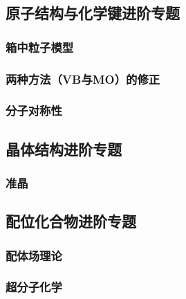 \newpage
\subsection{原子结构与化学键进阶专题}
\subsubsection{箱中粒子模型}
\subsubsection{两种方法（VB与MO）的修正}
\subsubsection{分子对称性}

\newpage
\subsection{晶体结构进阶专题}
\subsubsection{准晶}

\newpage
\subsection{配位化合物进阶专题}
\subsubsection{配体场理论}
\subsubsection{超分子化学}
